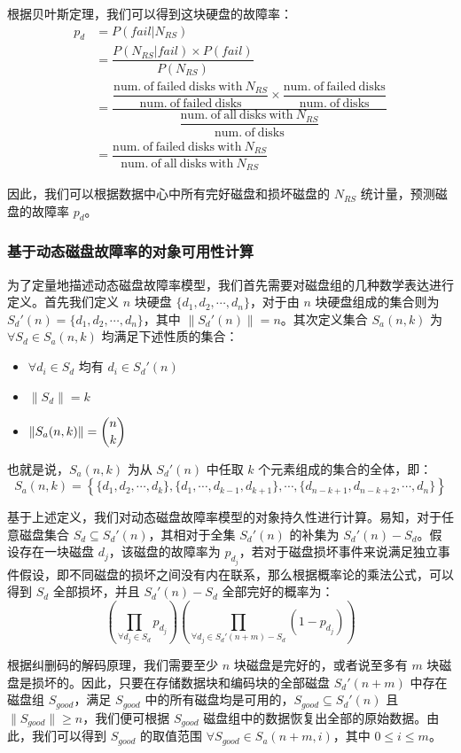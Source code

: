 根据贝叶斯定理，我们可以得到这块硬盘的故障率：
\begin{align*}
p_d&=P(fail|N_{RS})\\
&=\dfrac{P(N_{RS}|fail){\times}P(fail)}{P(N_{RS})}\\
&=\dfrac{\dfrac{\mathrm{num.\ of\ failed\ disks\ with\ }N_{RS}}{\mathrm{num.\ of\ failed\ disks}}\times\dfrac{\mathrm{num.\ of\ failed\ disks}}{\mathrm{num.\ of\ disks}}}{\dfrac{\mathrm{num.\ of\ all\ disks\ with\ }N_{RS}}{\mathrm{num.\ of\ disks}}}\\
&=\dfrac{\mathrm{num.\ of\ failed\ disks\ with\ }N_{RS}}{\mathrm{num.\ of\ all\ disks\ with\ }N_{RS}}
\end{align*}

因此，我们可以根据数据中心中所有完好磁盘和损坏磁盘的 $N_{RS}$ 统计量，预测磁盘的故障率 $p_d$。
\subsubsection{基于动态磁盘故障率的对象可用性计算}
为了定量地描述动态磁盘故障率模型，我们首先需要对磁盘组的几种数学表达进行定义。首先我们定义 $n$ 块硬盘 $\{d_1,d_2,\cdots,d_n\}$，对于由 $n$ 块硬盘组成的集合则为 $S_{d}'(n)=\{d_1,d_2,\cdots,d_n\}$，其中 $\|S_{d}'(n)\|=n$。其次定义集合 $S_{a}(n,k)$ 为 ${\forall}S_{d}{\in}S_{a}(n,k)$ 均满足下述性质的集合：
\begin{itemize}
\item ${\forall}d_{i}{\in}S_{d}$ 均有 $d_{i}{\in}S_{d}'(n)$
\item $\|S_{d}\|=k$
\item $\|S_{a}(n,k)\|=\dbinom{n}{k}$
\end{itemize}

也就是说，$S_{a}(n,k)$ 为从 $S_{d}'(n)$ 中任取 $k$ 个元素组成的集合的全体，即：
$$
S_{a}(n,k)=\left\{\{d_{1},d_{2},\cdots,d_{k}\},\{d_{1},\cdots,d_{k-1},d_{k+1}\},\cdots,\{d_{n-k+1},d_{n-k+2},\cdots,d_{n}\}\right\}
$$

基于上述定义，我们对动态磁盘故障率模型的对象持久性进行计算。易知，对于任意磁盘集合 $S_{d}{\subseteq}S_{d}'(n)$，其相对于全集 $S_{d}'(n)$ 的补集为 $S_{d}'(n)-S_{d}$。假设存在一块磁盘 $d_j$，该磁盘的故障率为 $p_{d_j}$，若对于磁盘损坏事件来说满足独立事件假设，即不同磁盘的损坏之间没有内在联系，那么根据概率论的乘法公式，可以得到 $S_{d}$ 全部损坏，并且 $S_{d}'(n)-S_{d}$ 全部完好的概率为：
$$
\left(\prod_{{\forall}d_{j}{\in}S_{d}}{p_{d_j}}\right)\left(\prod_{{\forall}d_{j}{\in}S_{d}'(n+m)-S_{d}}(1-p_{d_j})\right)
$$

根据纠删码的解码原理，我们需要至少 $n$ 块磁盘是完好的，或者说至多有 $m$ 块磁盘是损坏的。因此，只要在存储数据块和编码块的全部磁盘 $S_{d}'(n+m)$ 中存在磁盘组 $S_{good}$，满足 $S_{good}$ 中的所有磁盘均是可用的，$S_{good}{\subseteq}S_{d}'(n)$ 且 $\|S_{good}\| \geq n$，我们便可根据 $S_{good}$ 磁盘组中的数据恢复出全部的原始数据。由此，我们可以得到 $S_{good}$ 的取值范围 ${\forall}S_{good}{\in}S_{a}(n+m,i)$，其中 $0 \leq i \leq m$。

